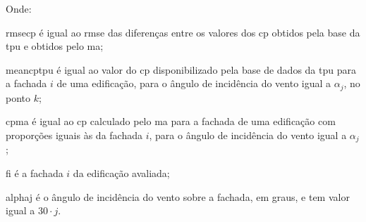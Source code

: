 \documentclass[brazil,hardcopy,openany]{ufscthesis} %
\begin{document}
Onde:

\gls{rmsecp} é igual ao \acrshort{rmse} das diferenças entre os valores dos \acrshort{cp} obtidos pela base da \acrshort{tpu} e obtidos pelo \acrlong{ma};

\gls{meancptpu} é igual ao valor do \acrshort{cp} disponibilizado pela base de dados da \acrshort{tpu} para a fachada $i$ de uma edificação, para o ângulo de incidência do vento igual a $\alpha_j$, no ponto $k$;

\gls{cpma} é igual ao \acrshort{cp} calculado pelo \acrlong{ma} para a fachada de uma edificação com proporções iguais às da fachada $i$, para o ângulo de incidência do vento igual a $\alpha_j$;

\gls{fi} é a fachada $i$ da edificação avaliada;

\gls{alphaj} é o ângulo de incidência do vento  sobre a fachada, em graus, e tem valor igual a $30 \cdot j$.	
\\

\end{document}
